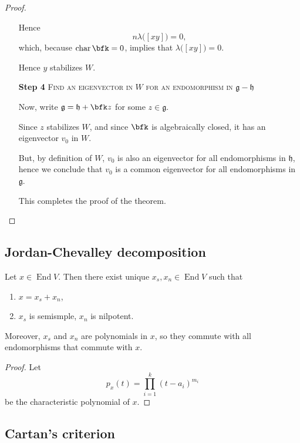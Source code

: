 \documentclass{article}
\newcommand{\lb}[1]{\ensuremath{\left[{#1}\right]}}
\DeclareMathOperator{\End}{End}
\DeclareMathOperator{\opchar}{char}
\newcommand*\frkg{{\ensuremath{\mathfrak{g}}}}
\newcommand*\frkh{{\ensuremath{\mathfrak{h}}}}
\begin{document}
\begin{proof}
\begin{itemize}
            Hence
            \[
                n\lambda\Big(\lb{xy}\Big)
                =
                0,
            \]
            which, because $\opchar \bfk = 0$, implies that $\lambda\Big(\lb{xy}\Big) = 0$.

            Hence $y$ stabilizes $W$.
    \item[\textbf{Step 4}]
        \textsc{\color{Crimson} Find an eigenvector in $W$ for an endomorphism in $\frkg - \frkh$}

        Now, write $\frkg = \frkh + \bfk z$ for some $z \in \frkg$.

        Since $z$ stabilizes $W$, and since $\bfk$ is algebraically closed, it has an eigenvector $v_0$ in $W$.

        But, by definition of $W$, $v_0$ is also an eigenvector for all endomorphisms in $\frkh$, hence we conclude that $v_0$ is a common eigenvector for all endomorphisms in $\frkg$.

        This completes the proof of the theorem.
    \end{itemize}

\end{proof}

\subsection{Jordan-Chevalley decomposition}

\begin{theorem}
    Let $x \in \End V$.
    Then there exist unique $x_s, x_n \in \End V$ such that
    \begin{enumerate}[label=(\alph*)]
        \item 
            $x = x_s + x_n$,
        \item 
            $x_s$ is semismple, $x_n$ is nilpotent.
    \end{enumerate}
    Moreover, $x_s$ and $x_n$ are polynomials in $x$, so they commute with all endomorphisms that commute with $x$.
\end{theorem}

\begin{proof}
    Let
    \[
        p_x(t)
        =
        \prod_{i=1}^k
        (t - a_i)^{m_i}
    \]
    be the characteristic polynomial of $x$.
\end{proof}

\subsection{Cartan's criterion}
\end{document}

